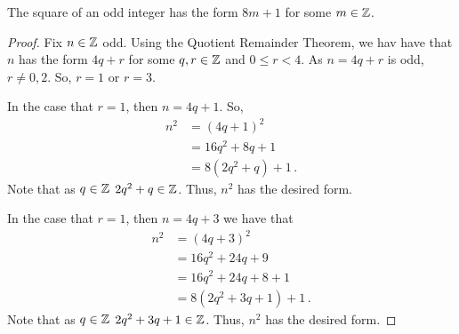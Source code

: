 \guard




\begin{prop}
\label{prop:squareOfOdd}
  The square of an odd integer has the form $8m+1$ for some $m\in\mathbb{Z}$.
\end{prop}
\begin{proof}
  Fix $n\in\mathbb{Z}$ odd.
  Using the Quotient Remainder Theorem, we hav have that $n$ has the form $4q+r$ for some $q,r\in\mathbb{Z}$ and $0\leq r<4$.
  As $n=4q+r$ is odd, $r\not=0,2$.
  So, $r=1$ or $r=3$.

  In the case that $r=1$, then $n=4q+1$.
  So,
  \begin{align*}
    n^2 &= (4q+1)^2 \\
        &= 16q^2 + 8q + 1 \\
        &= 8(2q^2+q) + 1\,.
  \end{align*}
  Note that as $q\in\mathbb{Z}$ $2q^2+q\in\mathbb{Z}$.
  Thus, $n^2$ has the desired form.

  In the case that $r=1$, then $n=4q+3$ we have that
  \begin{align*}
    n^2 &= (4q+3)^2 \\
        &= 16q^2 + 24q + 9 \\
        &= 16q^2 + 24q + 8 + 1 \\
        &= 8(2q^2+3q+1) + 1\,.
  \end{align*}
  Note that as $q\in\mathbb{Z}$ $2q^2+3q+1\in\mathbb{Z}$.
  Thus, $n^2$ has the desired form.
\end{proof}
